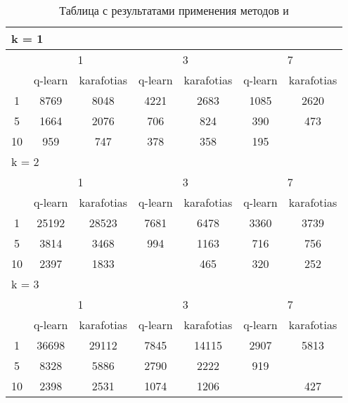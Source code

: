\begin{table}
  \centering
  \begin{tabular}{|*7{c|}}
    \hline
    \multicolumn{7}{|l|}{k = 1} \\
    \hline
    \multirow{2}{*}{\diagbox{$\mu$}{$\lambda$}} & \multicolumn{2}{c|}{1} & \multicolumn{2}{c|}{3} & \multicolumn{2}{c|}{7} \\
    \cline{2-7}
    & q-learn & karafotias & q-learn & karafotias & q-learn & karafotias \\
    \hline
    1 & 8769 & 8048 & 4221 & 2683 & 1085 & 2620 \\
    \hline
    5 & 1664 & 2076 & 706 & 824 & 390 & 473 \\
    \hline
    10 & 959& 747 & 378 & 358 & 195 & \cellcolor{olive}{167} \\
    \hline
    \multicolumn{7}{|l|}{k = 2} \\
    \hline
    \multirow{2}{*}{\diagbox{$\mu$}{$\lambda$}} & \multicolumn{2}{c|}{1} & \multicolumn{2}{c|}{3} & \multicolumn{2}{c|}{7} \\
    \cline{2-7}
    & q-learn & karafotias & q-learn & karafotias & q-learn & karafotias \\
    \hline
    1 & 25192 & 28523 & 7681 & 6478 & 3360 & 3739 \\
    \hline
    5 & 3814 & 3468 & 994 & 1163 & 716 & 756 \\
    \hline
    10 & 2397 & 1833& \cellcolor{olive}{445} & 465 & 320 & 252 \\
    \hline
    \multicolumn{7}{|l|}{k = 3} \\
    \hline
    \multirow{2}{*}{\diagbox{$\mu$}{$\lambda$}} & \multicolumn{2}{c|}{1} & \multicolumn{2}{c|}{3} & \multicolumn{2}{c|}{7} \\
    \cline{2-7}
    & q-learn & karafotias & q-learn & karafotias & q-learn & karafotias \\
    \hline
    1 & 36698 & 29112 & 7845 & 14115 & 2907 & 5813 \\
    \hline
    5 & 8328 & 5886 & 2790 & 2222 & 919& \cellcolor{olive}{777} \\
    \hline
    10 & 2398 & 2531 & 1074 & 1206& \cellcolor{olive}{391} & 427 \\
    \hline
    \end{tabular}
  \captionsetup{justification=centering}
  \caption{Таблица с результатами применения методов  и }
\end{table}

